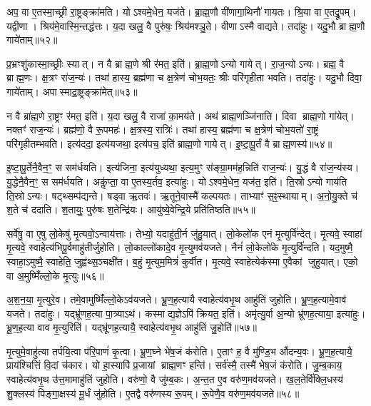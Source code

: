 अप॒ वा ए॒तस्मा॒च्छ्री रा॒ष्ट्रङ्क्रा॑मति।
योऽश्वमे॒धेन॒ यज॑ते।
ब्रा॒ह्म॒णौ वी॑णागा॒थिनौ॑ गायतः।
श्रि॒या वा ए॒तद्रू॒पम्।
यद्वीणा।
श्रिय॑मे॒वास्मि॒न्तद्ध॑त्तः।
य॒दा खलु॒ वै पुरु॑षः॒ श्रिय॑मश्ञु॒ते।
वीणा\-ऽस्मै वाद्यते।
तदा॑हुः।
यदु॒भौ ब्राह्म॒णौ गाये॑ताम्॥५२॥

प्र॒भ्रꣳशु॑कास्मा॒च्छ्रीः स्यात्।
न वै ब्राह्म॒णे श्री र॑मत॒ इति॑।
ब्रा॒ह्म॒णो\-ऽन्यो गायेत्।
रा॒ज॒न्यो\-ऽन्यः।
ब्रह्म॒ वै ब्राह्म॒णः।
क्ष॒त्रꣳ रा॑ज॒न्यः॑।
तथा॑ हास्य॒ ब्रह्म॑णा च क्ष॒त्रेण॑ चोभ॒यतः॒ श्रीः परि॑गृहीता भवति।
तदा॑हुः।
यदु॒भौ दिवा॒ गाये॑ताम्।
अपास्माद्रा॒ष्ट्रङ्क्रा॑मेत्॥५३॥

न वै ब्रा॑ह्म॒णे रा॒ष्ट्रꣳ र॑मत॒ इति॑।
य॒दा खलु॒ वै राजा॑ का॒मय॑ते।
अथ॑ ब्राह्म॒णञ्जि॑नाति।
दिवा ब्राह्म॒णो गा॑येत्।
नक्तꣳ॑ राज॒न्यः॑।
ब्रह्म॑णो॒ वै रू॒पमहः॑।
क्ष॒त्रस्य॒ रात्रिः॑।
तथा॑ हास्य॒ ब्रह्म॑णा च क्ष॒त्रेण॑ चोभ॒यतो॑ रा॒ष्ट्रं परि॑गृहीतम्भवति।
इत्य॑ददा॒ इत्य॑यजथा॒ इत्य॑पच॒ इति॑ ब्राह्म॒णो गायेत्।
इ॒ष्टा॒पू॒र्तं वै ब्राह्म॒णस्य॑॥५४॥

इ॒ष्टा॒पू॒र्तेनै॒वैन॒ꣳ॒ स सम॑र्धयति।
इत्य॑जिना॒ इत्य॑युध्यथा॒ इत्य॒मुꣳ स॑ङ्ग्रा॒मम॑ह॒न्निति॑ राज॒न्यः॑।
यु॒द्धं वै रा॑ज॒न्य॑स्य।
यु॒द्धेनै॒वैन॒ꣳ॒ स सम॑र्धयति।
अकॢ॑प्ता॒ वा ए॒तस्य॒र्तव॒ इत्या॑हुः।
योऽश्वमे॒धेन॒ यज॑त॒ इति॑।
ति॒स्रो\-ऽन्यो गाय॑ति ति॒स्रो\-ऽन्यः।
षट्थ्सम्प॑द्यन्ते।
षड्वा ऋ॒तवः॑।
ऋ॒तूने॒वास्मै॑ कल्पयतः।
ताभ्याꣳ॑ स॒ꣴ॒स्थायाम्।
अ॒नो॒यु॒क्ते च॑ श॒ते च॑ ददाति।
श॒तायुः॒ पुरु॑षः श॒तेन्द्रि॑यः।
आयु॑ष्ये॒वेन्द्रि॒ये प्रति॑तिष्ठति॥५५॥\anuvakamend[गाये॑ताङ्क्रामेद्ब्राह्म॒णस्य॑ कल्पयतश्च॒त्वारि॑ च]

सर्वे॑षु॒ वा ए॒षु लो॒केषु॑ मृ॒त्यवो॒\-ऽन्वाय॑त्ताः।
तेभ्यो॒ यदाहु॑ती॒र्न जु॑हु॒यात्।
लो॒केलो॑क एनं मृ॒त्युर्वि॑न्देत्।
मृ॒त्यवे॒ स्वाहा॑ मृ॒त्यवे॒ स्वाहेत्य॑भिपू॒र्वमाहु॑तीर्जुहोति।
लो॒काल्लो॑कादे॒व मृ॒त्युमव॑यजते।
नैनं॑ लो॒केलो॑के मृ॒त्युर्वि॑न्दति।
यद॒मुष्मै॒ स्वाहा॒\-ऽमुष्मै॒ स्वाहेति॒ जुह्व॑थ्स॒ञ्चक्षी॑त।
ब॒हुं मृ॒त्युम॒मित्रं॑ कुर्वीत।
मृ॒त्यवे॒ स्वाहेत्येक॑स्मा ए॒वैकां जुहुयात्।
एको॒ वा अ॒मुष्मिँ॑ल्लो॒के मृ॒त्युः॥५६॥

अ॒श॒न॒या॒ मृ॒त्युरे॒व।
तमे॒वामुष्मिँ॑ल्लो॒के\-ऽव॑यजते।
भ्रू॒ण॒ह॒त्यायै स्वाहेत्य॑वभृ॒थ आहु॑तिं जुहोति।
भ्रू॒ण॒ह॒त्यामे॒वाव॑ यजते।
तदा॑हुः।
यद्भ्रू॑णह॒त्या पा॒त्र्याऽथ॑।
कस्माद्य॒ज्ञेऽपि॑ क्रियत॒ इति॑।
अमृ॑त्यु॒र्वा अ॒न्यो भ्रू॑णह॒त्याया॒ इत्या॑हुः।
भ्रू॒ण॒ह॒त्या वाव मृ॒त्युरिति॑।
यद्भ्रू॑णह॒त्यायै॒ स्वाहेत्य॑वभृ॒थ आहु॑तिं जु॒होति॑॥५७॥

मृ॒त्युमे॒वाहु॑त्या तर्पयि॒त्वा प॑रि॒पाणं॑ कृ॒त्वा।
भ्रू॒ण॒घ्ने भे॑ष॒जं क॑रोति।
ए॒ताꣳ ह॒ वै मु॑ण्डि॒भ औ॑दन्य॒वः।
भ्रू॒ण॒ह॒त्यायै॒ प्राय॑श्चित्तिं वि॒दां च॑कार।
यो हा॒स्यापि॑ प्र॒जायां ब्राह्म॒णꣳ हन्ति॑।
सर्व॑स्मै॒ तस्मै॑ भेष॒जं क॑रोति।
जु॒म्ब॒काय॒ स्वाहेत्य॑वभृ॒थ उ॑त्त॒मामाहु॑तिं जुहोति।
वरु॑णो॒ वै जु॑म्ब॒कः।
अ॒न्त॒त ए॒व वरु॑ण॒मव॑यजते।
ख॒ल॒तेर्वि॑क्लि॒धस्य॑ शु॒क्लस्य॑ पिङ्गा॒क्षस्य॑ मू॒र्धं जु॑होति।
ए॒तद्वै वरु॑णस्य रू॒पम्।
रू॒पेणै॒व वरु॑ण॒मव॑यजते॥५८॥\anuvakamend[लो॒के मृ॒त्युर्जु॒होति॑ मू॒र्धं जु॑होति॒ द्वे च॑]


